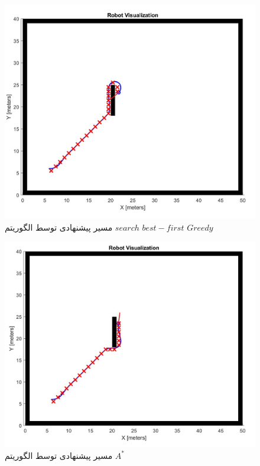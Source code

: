 \begin{figure}[!h]
	\centering
	\includegraphics[scale=0.35]{Images/Greedy path.jpg}
	\caption{مسیر پیشنهادی توسط الگوریتم $search$ $best-first$ $Greedy$}\label{Fig Greedy path}
\end{figure}

\begin{figure}[!h]
	\centering
	\includegraphics[scale=0.35]{Images/A-star path.jpg}
	\caption{مسیر پیشنهادی توسط الگوریتم $A^*$}\label{Fig A-star path}
\end{figure}

